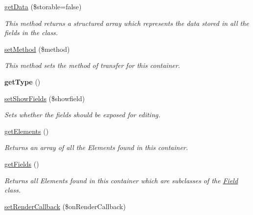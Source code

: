 \begin{DoxyCompactItemize}
\item 
\hyperlink{class_container_a06e9edea6936eccbf9185205e9fccf2b}{getData} (\$storable=false)
\begin{DoxyCompactList}\small\item\em This method returns a structured array which represents the data stored in all the fields in the class. \item\end{DoxyCompactList}\item 
\hyperlink{class_container_aa806af628c1f17bc0617b98adb014e04}{setMethod} (\$method)
\begin{DoxyCompactList}\small\item\em This method sets the method of transfer for this container. \item\end{DoxyCompactList}\item 
\hypertarget{class_container_aeb129a2def4f33d1eebc5e58d2e2deb2}{
{\bfseries getType} ()}
\label{class_container_aeb129a2def4f33d1eebc5e58d2e2deb2}

\item 
\hyperlink{class_container_a2b2b5903cbb6e310a65a0e03f81c63f7}{setShowFields} (\$showfield)
\begin{DoxyCompactList}\small\item\em Sets whether the fields should be exposed for editing. \item\end{DoxyCompactList}\item 
\hypertarget{class_container_a3dd3bd23dbdf3c65309dc5308df0b0dd}{
\hyperlink{class_container_a3dd3bd23dbdf3c65309dc5308df0b0dd}{getElements} ()}
\label{class_container_a3dd3bd23dbdf3c65309dc5308df0b0dd}

\begin{DoxyCompactList}\small\item\em Returns an array of all the Elements found in this container. \item\end{DoxyCompactList}\item 
\hyperlink{class_container_afc70470c046a91ab7fd03aeba613f23d}{getFields} ()
\begin{DoxyCompactList}\small\item\em Returns all Elements found in this container which are subclasses of the \hyperlink{class_field}{Field} class. \item\end{DoxyCompactList}\item 
\hypertarget{class_container_a017f865cd6be53e35fab33f55027e922}{
\hyperlink{class_container_a017f865cd6be53e35fab33f55027e922}{setRenderCallback} (\$onRenderCallback)}
\label{class_container_a017f865cd6be53e35fab33f55027e922}


\end{DoxyCompactItemize}
